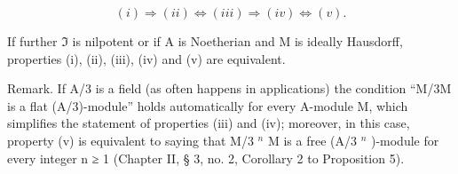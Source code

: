 \[
(i) \Rightarrow (i i) \Leftrightarrow (i i i) \Rightarrow (i v) \Leftrightarrow (v).
\]

If further \(\mathfrak{I}\) is nilpotent or if A is Noetherian and M is ideally Hausdorff, properties (i), (ii), (iii), (iv) and (v) are equivalent.

Remark. If A/3 is a field (as often happens in applications) the condition ``M/3M is a flat (A/3)-module'' holds automatically for every A-module M, which simplifies the statement of properties (iii) and (iv); moreover, in this case, property (v) is equivalent to saying that M/3 \(^{n}\) M is a free (A/3 \(^{n}\) )-module for every integer n ≥ 1 (Chapter II, § 3, no. 2, Corollary 2 to Proposition 5).

